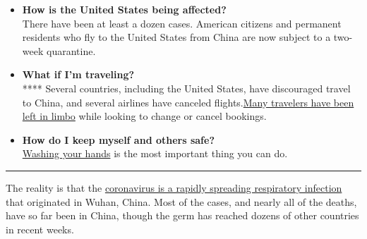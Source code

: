 \begin{itemize}
  \begin{itemize}
  \tightlist
  \item
    \textbf{How is the United States being affected?}\\
    There have been at least a dozen cases. American citizens and
    permanent residents who fly to the United States from China are now
    subject to a two-week quarantine.
  \end{itemize}

  \begin{itemize}
  \tightlist
  \item
    \textbf{What if I'm traveling?}\\
    **** Several countries, including the United States, have
    discouraged travel to China, and several airlines have canceled
    flights.\href{https://web.archive.org/web/20200206210009/https://www.nytimes.com/2020/02/04/travel/coronavirus-travel-plans.html?action=click\&pgtype=Article\&state=default\&module=styln-coronavirus®ion=MID_MAIN_CONTENT\&context=storyline_guide}{}\href{https://web.archive.org/web/20200206210009/https://www.nytimes.com/2020/02/04/travel/coronavirus-travel-plans.html?action=click\&pgtype=Article\&state=default\&module=styln-coronavirus®ion=MID_MAIN_CONTENT\&context=storyline_guide}{Many
    travelers have been left in limbo} while looking to change or cancel
    bookings.
  \end{itemize}

  \begin{itemize}
  \tightlist
  \item
    \textbf{How do I keep myself and others safe?}\\
    \href{https://web.archive.org/web/20200206210009/https://www.nytimes.com/2020/01/23/health/coronavirus-surgical-masks.html?action=click\&pgtype=Article\&state=default\&module=styln-coronavirus®ion=MID_MAIN_CONTENT\&context=storyline_guide}{Washing
    your hands} is the most important thing you can do.
  \end{itemize}
\end{itemize}

\begin{center}\rule{0.5\linewidth}{\linethickness}\end{center}

The reality is that the
\href{https://web.archive.org/web/20200206210009/https://www.nytimes.com/article/what-is-coronavirus.html?action=click\&pgtype=Article\&state=default\&module=styln-coronavirus\&variant=show\&region=MID_MAIN_CONTENT\&context=storyline_guide}{coronavirus
is a rapidly spreading respiratory infection} that originated in Wuhan,
China. Most of the cases, and nearly all of the deaths, have so far been
in China, though the germ has reached dozens of other countries in
recent weeks.

